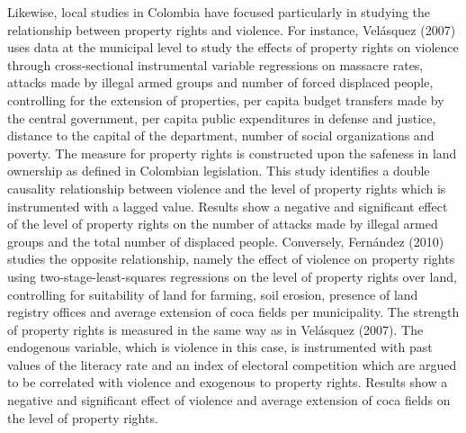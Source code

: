 \documentclass[12pt,a4paper,english]{article}%
\begin{document}
Likewise, local studies in Colombia have focused particularly in studying the relationship between property rights and violence. For instance, Vel\'{a}squez (2007) uses data at the municipal level to study the effects of property rights on violence through cross-sectional instrumental variable regressions on massacre rates, attacks made by illegal armed groups and number of forced displaced people, controlling for the extension of properties, per capita budget transfers made by the central government, per capita public expenditures in defense and justice, distance to the capital of the department, number of social organizations and poverty. The measure for property rights is constructed upon the safeness in land ownership as defined in Colombian legislation. This study identifies a double causality relationship between violence and the level of property rights which is instrumented with a lagged value. Results show a negative and significant effect of the level of property rights on the number of attacks made by illegal armed groups and the total number of displaced people. Conversely, Fern\'{a}ndez (2010) studies the opposite relationship, namely the effect of violence on property rights using two-stage-least-squares regressions on the level of property rights over land, controlling for suitability of land for farming, soil erosion, presence of land registry offices and average extension of coca fields per municipality. The strength of property rights is measured in the same way as in Vel\'{a}squez (2007). The endogenous variable, which is violence in this case, is instrumented with past values of the literacy rate and an index of electoral competition which are argued to be correlated with violence and exogenous to property rights. Results show a negative and significant effect of violence and average extension of coca fields on the level of property rights.
\end{document}
